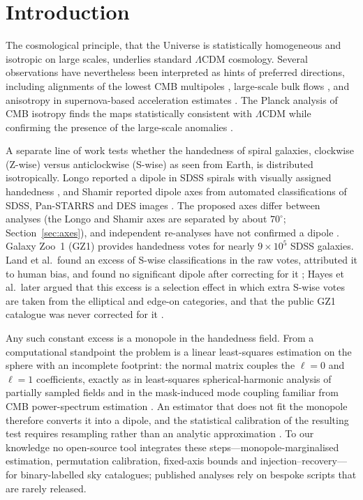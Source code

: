\documentclass[preprint,12pt]{elsarticle}
\begin{document}
\section{Introduction}
\label{sec:intro}

The cosmological principle, that the Universe is statistically homogeneous and isotropic on large scales, underlies standard $\Lambda$CDM cosmology.
Several observations have nevertheless been interpreted as hints of preferred directions, including alignments of the lowest CMB multipoles \cite{Oliveira2004,LandMagueijo2005,Schwarz2016}, large-scale bulk flows \cite{Watkins2009,Kashlinsky2008}, and anisotropy in supernova-based acceleration estimates \cite{Colin2019}.
The Planck analysis of CMB isotropy finds the maps statistically consistent with $\Lambda$CDM while confirming the presence of the large-scale anomalies \cite{Planck2018VII}.

A separate line of work tests whether the handedness of spiral galaxies, clockwise (Z-wise) versus anticlockwise (S-wise) as seen from Earth, is distributed isotropically.
Longo reported a dipole in SDSS spirals with visually assigned handedness \cite{Longo2011}, and Shamir reported dipole axes from automated classifications of SDSS, Pan-STARRS and DES images \cite{Shamir2012,Shamir2016,Shamir2020,Shamir2022}.
The proposed axes differ between analyses (the Longo and Shamir axes are separated by about $70^\circ$; Section~\ref{sec:axes}), and independent re-analyses have not confirmed a dipole \cite{Iye2021,PatelDesmond2024}.
Galaxy Zoo~1 (GZ1) \cite{Lintott2008,Lintott2011} provides handedness votes for nearly $9\times10^5$ SDSS galaxies.
Land et al.\ found an excess of S-wise classifications in the raw votes, attributed it to human bias, and found no significant dipole after correcting for it \cite{Land2008}; Hayes et al.\ later argued that this excess is a selection effect in which extra S-wise votes are taken from the elliptical and edge-on categories, and that the public GZ1 catalogue was never corrected for it \cite{Hayes2017}.

Any such constant excess is a monopole in the handedness field.
From a computational standpoint the problem is a linear least-squares estimation on the sphere with an incomplete footprint: the normal matrix couples the $\ell=0$ and $\ell=1$ coefficients, exactly as in least-squares spherical-harmonic analysis of partially sampled fields \cite{Martinec1991} and in the mask-induced mode coupling familiar from CMB power-spectrum estimation \cite{Hivon2002}.
An estimator that does not fit the monopole therefore converts it into a dipole, and the statistical calibration of the resulting test requires resampling rather than an analytic approximation \cite{Berg1992conf,Wolff2004}.
To our knowledge no open-source tool integrates these steps---monopole-marginalised estimation, permutation calibration, fixed-axis bounds and injection--recovery---for binary-labelled sky catalogues; published analyses rely on bespoke scripts that are rarely released.
\end{document}
